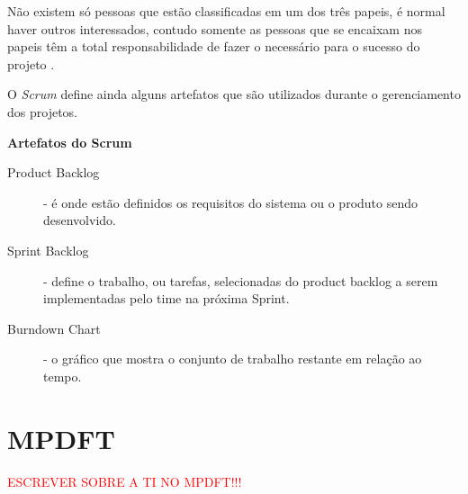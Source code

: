 \documentclass[
	article,			%
	11pt,				%
	oneside,			%
	a4paper,			%
	english,			%
	brazil,				%
	sumario=tradicional
	]{abntex2}
\begin{document}
Não existem só pessoas que estão classificadas em um dos três papeis, é normal
haver outros interessados, contudo somente as pessoas que se encaixam nos
papeis têm a total responsabilidade de fazer o necessário para o sucesso do
projeto \cite{schwaber2002agile}.

O \textit{Scrum} define ainda alguns artefatos que são utilizados durante o
gerenciamento dos projetos.

\textbf{Artefatos do Scrum}

\begin{description}
   \item[Product Backlog] - é onde estão definidos os requisitos do sistema ou o
   produto sendo desenvolvido.
   \item[Sprint Backlog] - define o trabalho, ou tarefas, selecionadas do
   product backlog a serem implementadas pelo time na próxima Sprint.
   \item[Burndown Chart] - o gráfico que mostra o conjunto de trabalho restante
   em relação ao tempo.
\end{description}






\section{MPDFT}

\textcolor{red}{ESCREVER SOBRE A TI NO MPDFT!!!}
\end{document}
